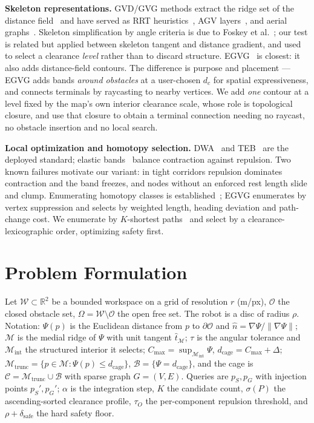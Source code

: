 \documentclass[conference]{IEEEtran}
\begin{document}
\textbf{Skeleton representations.} GVD/GVG methods extract the ridge set of the distance field~\cite{lau2013,hoff1999} and have served as RRT heuristics~\cite{chi2022}, AGV layers~\cite{zhang2024agv}, and aerial graphs~\cite{oleynikova2018}. Skeleton simplification by angle criteria is due to Foskey et al.~\cite{foskey2003}; our test is related but applied between skeleton tangent and distance gradient, and used to select a clearance \emph{level} rather than to discard structure. EGVG~\cite{qi2025egvg} is closest: it also adds distance-field contours. The difference is purpose and placement --- EGVG adds bands \emph{around obstacles} at a user-chosen $d_c$ for spatial expressiveness, and connects terminals by raycasting to nearby vertices. We add \emph{one} contour at a level fixed by the map's own interior clearance scale, whose role is topological closure, and use that closure to obtain a terminal connection needing no raycast, no obstacle insertion and no local search.

\textbf{Local optimization and homotopy selection.} DWA~\cite{fox1997} and TEB~\cite{rosmann2012} are the deployed standard; elastic bands~\cite{quinlan1993} balance contraction against repulsion. Two known failures motivate our variant: in tight corridors repulsion dominates contraction and the band freezes, and nodes without an enforced rest length slide and clump. Enumerating homotopy classes is established~\cite{bhattacharya2012,qi2025egvg}; EGVG enumerates by vertex suppression and selects by weighted length, heading deviation and path-change cost. We enumerate by $K$-shortest paths~\cite{yen1971} and select by a clearance-lexicographic order, optimizing safety first.

\section{Problem Formulation}
\label{sec:problem}

Let $\mathcal{W}\subset\mathbb{R}^2$ be a bounded workspace on a grid of resolution $r$ (m/px), $\mathcal{O}$ the closed obstacle set, $\Omega=\mathcal{W}\setminus\mathcal{O}$ the open free set. The robot is a disc of radius $\rho$. Notation: $\Psi(p)$ is the Euclidean distance from $p$ to $\partial\mathcal{O}$ and $\hat{n}=\nabla\Psi/\|\nabla\Psi\|$; $\mathcal{M}$ is the medial ridge of $\Psi$ with unit tangent $\hat{t}_{\mathcal{M}}$; $\tau$ is the angular tolerance and $\mathcal{M}_{\mathrm{int}}$ the structured interior it selects; $C_{\max}=\sup_{\mathcal{M}_{\mathrm{int}}}\Psi$, $d_{\mathrm{cage}}=C_{\max}+\Delta$; $\mathcal{M}_{\mathrm{trunc}}=\{p\in\mathcal{M}:\Psi(p)\le d_{\mathrm{cage}}\}$, $\mathcal{B}=\{\Psi=d_{\mathrm{cage}}\}$, and the cage is $\mathcal{C}=\mathcal{M}_{\mathrm{trunc}}\cup\mathcal{B}$ with sparse graph $G=(V,E)$. Queries are $p_S,p_G$ with injection points $p_S',p_G'$; $\alpha$ is the integration step, $K$ the candidate count, $\sigma(P)$ the ascending-sorted clearance profile, $\tau_O$ the per-component repulsion threshold, and $\rho+\delta_{\mathrm{safe}}$ the hard safety floor.
\end{document}

